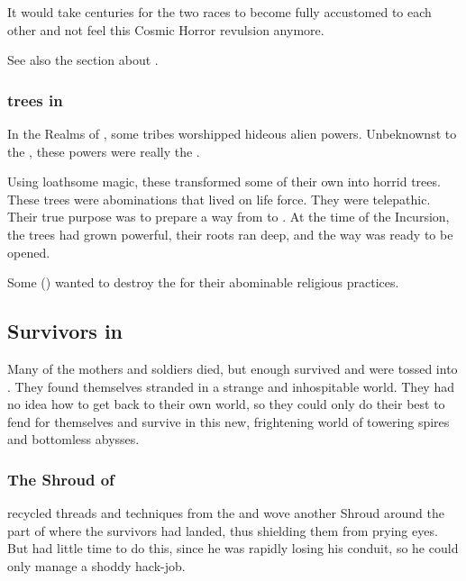 It would take centuries for the two races to become fully accustomed to each other and not feel this Cosmic Horror revulsion anymore. 

See also the section about . 





\subsubsection{\Human trees in \Tembrae}
In the Realms of \Tembrae, some \human tribes worshipped hideous alien powers.
Unbeknownst to the \dragons, these powers were really the \banes.

Using loathsome magic, these \humans transformed some of their own into horrid trees. 
These trees were abominations that lived on life force. 
They were telepathic. 
Their true purpose was to prepare a way from \Nyx to \Tembrae. 
At the time of the Incursion, the \human trees had grown powerful, their roots ran deep, and the way was ready to be opened. 

Some \dragons () wanted to destroy the \humans for their abominable religious practices. 









\subsection{Survivors in \Nyx}
Many of the mothers and soldiers died, but enough survived and were tossed into \Nyx. 
They found themselves stranded in a strange and inhospitable world. 
They had no idea how to get back to their own world, so they could only do their best to fend for themselves and survive in this new, frightening world of towering spires and bottomless abysses. 





\subsubsection{The Shroud of \Nyx}
\Daggerrain{} recycled threads and techniques from the  and wove another Shroud around the part of \Nyx{} where the survivors had landed, thus shielding them from prying \draconian{} eyes. 
But \Daggerrain{} had little time to do this, since he was rapidly losing his conduit, so he could only manage a shoddy hack-job. 

